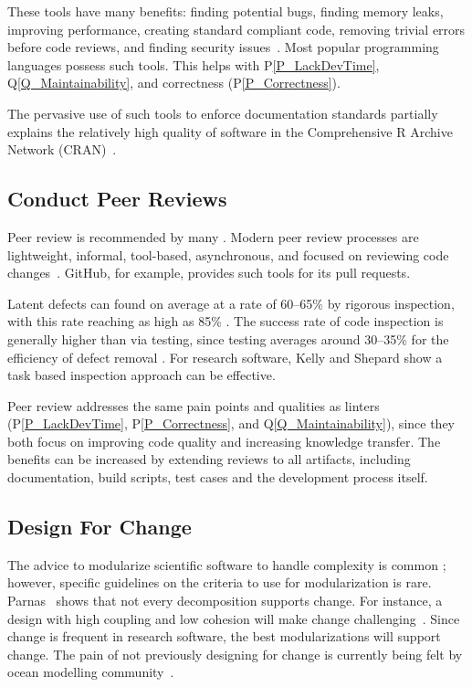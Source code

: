 \documentclass[draft, 12pt, 3p, times]{elsarticle} %
\newcommand{\ppref}[1]{P\ref{#1}}
\newcommand{\qref}[1]{Q\ref{#1}}
\begin{document}
These tools have many benefits: finding potential bugs, finding memory
leaks, improving performance, creating standard compliant code,
removing trivial errors before code reviews, and finding security
issues~\cite{SourceLevel2022_Lint}. Most popular programming languages possess
such tools. This helps with \ppref{P_LackDevTime}, \qref{Q_Maintainability},
and correctness (\ppref{P_Correctness}).

The pervasive use of such tools to enforce documentation standards partially
explains the relatively high quality of software in the Comprehensive R Archive
Network (CRAN)~\cite{SmithEtAl2018_StatSoft}.

\subsection{Conduct Peer Reviews} \label{Sec_PeerReview}

Peer review is recommended by many \cite{HerouxEtAl2008,
OrvizEtAl2017, USGS2019}. Modern peer review processes are lightweight,
informal, tool-based, asynchronous, and focused
on reviewing code changes~\cite{SadowskiEtAl2018}. GitHub, for example,
provides such tools for its pull requests.

Latent defects can found on average at a rate of 60--65\% by rigorous
inspection, with this rate reaching as high as 85\% \cite{Jones2008}. The
success rate of code inspection is generally higher than via testing, since
testing averages around 30--35\% for the efficiency of defect removal
\cite{Jones2008, EbertAndJones2009}. For research software, Kelly and Shepard
\cite{KellyAndShepard2000} show a task based inspection approach can be
effective.

Peer review addresses the same pain points and qualities as linters
(\ppref{P_LackDevTime}, \ppref{P_Correctness}, and \qref{Q_Maintainability}),
since they both focus on improving code quality and increasing knowledge
transfer.  The benefits can be increased by extending reviews to all artifacts,
including documentation, build scripts, test cases and the development process
itself.

\subsection{Design For Change} \label{Sec_DesForChange}

The advice to modularize scientific software to handle complexity is common
\cite{Storer2017, WilsonEtAl2014, StewartEtAl2017}; however, specific guidelines
on the criteria to use for modularization is rare.  Parnas~\cite{Parnas1972a}
shows that not every decomposition supports change.  For instance, a design with
high coupling and low cohesion will make change challenging~\cite[p.\
48]{GhezziEtAl2003}. Since change is frequent in research software, the best
modularizations will support change. The pain of not previously designing for
change is currently being felt by ocean modelling community~\cite{JungEtAl2022}.
\end{document}
